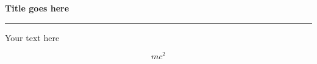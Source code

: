 
\begin{frame}
	\begin{block}{\color{white}\textbf{\Large{
					Title goes here
			}}}
		\vspace{-10pt}\rule{\textwidth}{0.5pt}
		\color{white}
		
		Your text here
		
		
	\end{block}
	{\large
		
		\begin{equation*} 
			mc^2
		\end{equation*}
	}

\end{frame}